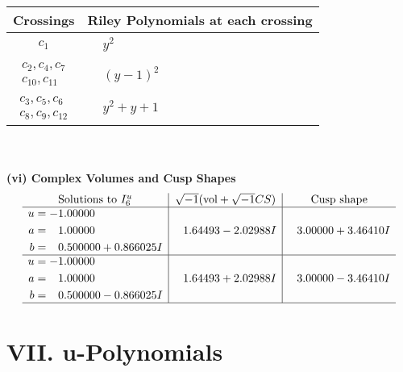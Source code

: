 \documentclass[1p]{elsarticle_modified}
\theoremstyle{definition}
\newcommand{\I}{\sqrt{-1}}
\begin{document}
\begin{tabular}{m{50pt}|m{274pt}}
Crossings & \hspace{64pt}Riley Polynomials at each crossing \\
\hline $$\begin{aligned}c_{1}\end{aligned}$$&$\begin{aligned}
&y^2
\end{aligned}$\\
\hline $$\begin{aligned}c_{2},c_{4},c_{7}\\c_{10},c_{11}\end{aligned}$$&$\begin{aligned}
&(y-1)^2
\end{aligned}$\\
\hline $$\begin{aligned}c_{3},c_{5},c_{6}\\c_{8},c_{9},c_{12}\end{aligned}$$&$\begin{aligned}
&y^2+y+1
\end{aligned}$\\
\hline
\end{tabular}\\~\\
\newpage\flushleft \textbf{(vi) Complex Volumes and Cusp Shapes}
$$\begin{array}{c|c|c}  
\text{Solutions to }I^u_{6}& \I (\text{vol} + \sqrt{-1}CS) & \text{Cusp shape}\\
 \hline 
\begin{aligned}
u &= -1.00000\phantom{ +0.000000I} \\
a &= \phantom{-}1.00000\phantom{ +0.000000I} \\
b &= \phantom{-}0.500000 + 0.866025 I\end{aligned}
 & \phantom{-}1.64493 - 2.02988 I & \phantom{-}3.00000 + 3.46410 I \\ \hline\begin{aligned}
u &= -1.00000\phantom{ +0.000000I} \\
a &= \phantom{-}1.00000\phantom{ +0.000000I} \\
b &= \phantom{-}0.500000 - 0.866025 I\end{aligned}
 & \phantom{-}1.64493 + 2.02988 I & \phantom{-}3.00000 - 3.46410 I\\
 \hline 
 \end{array}$$\newpage
\newpage\renewcommand{\arraystretch}{1}
\centering \section*{ VII. u-Polynomials}
\end{document}
